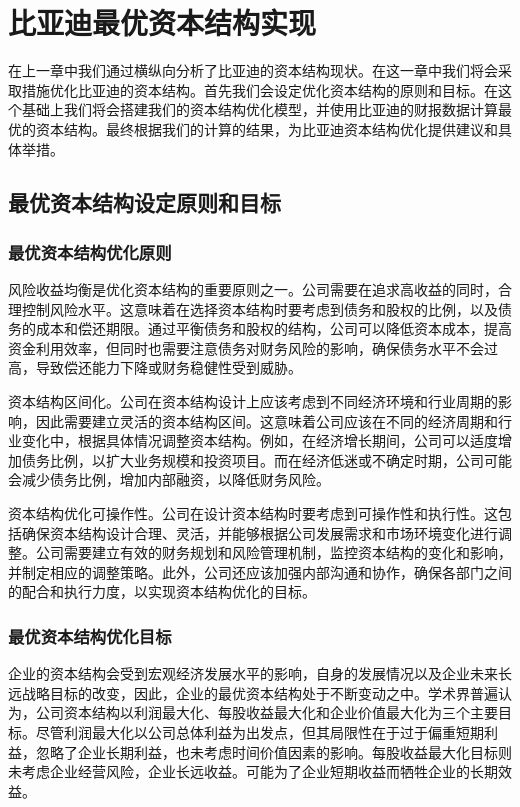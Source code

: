 \chapter{比亚迪最优资本结构实现}
在上一章中我们通过横纵向分析了比亚迪的资本结构现状。在这一章中我们将会采取措施优化比亚迪的资本结构。首先我们会设定优化资本结构的原则和目标。在这个基础上我们将会搭建我们的资本结构优化模型，并使用比亚迪的财报数据计算最优的资本结构。最终根据我们的计算的结果，为比亚迪资本结构优化提供建议和具体举措。
\section{最优资本结构设定原则和目标}
\subsection{最优资本结构优化原则}
风险收益均衡是优化资本结构的重要原则之一。公司需要在追求高收益的同时，合理控制风险水平。这意味着在选择资本结构时要考虑到债务和股权的比例，以及债务的成本和偿还期限。通过平衡债务和股权的结构，公司可以降低资本成本，提高资金利用效率，但同时也需要注意债务对财务风险的影响，确保债务水平不会过高，导致偿还能力下降或财务稳健性受到威胁。

资本结构区间化。公司在资本结构设计上应该考虑到不同经济环境和行业周期的影响，因此需要建立灵活的资本结构区间。这意味着公司应该在不同的经济周期和行业变化中，根据具体情况调整资本结构。例如，在经济增长期间，公司可以适度增加债务比例，以扩大业务规模和投资项目。而在经济低迷或不确定时期，公司可能会减少债务比例，增加内部融资，以降低财务风险。

资本结构优化可操作性。公司在设计资本结构时要考虑到可操作性和执行性。这包括确保资本结构设计合理、灵活，并能够根据公司发展需求和市场环境变化进行调整。公司需要建立有效的财务规划和风险管理机制，监控资本结构的变化和影响，并制定相应的调整策略。此外，公司还应该加强内部沟通和协作，确保各部门之间的配合和执行力度，以实现资本结构优化的目标。
\subsection{最优资本结构优化目标}
企业的资本结构会受到宏观经济发展水平的影响，自身的发展情况以及企业未来长远战略目标的改变，因此，企业的最优资本结构处于不断变动之中。学术界普遍认为，公司资本结构以利润最大化、每股收益最大化和企业价值最大化为三个主要目标。尽管利润最大化以公司总体利益为出发点，但其局限性在于过于偏重短期利益，忽略了企业长期利益，也未考虑时间价值因素的影响。每股收益最大化目标则未考虑企业经营风险，企业长远收益。可能为了企业短期收益而牺牲企业的长期效益。

